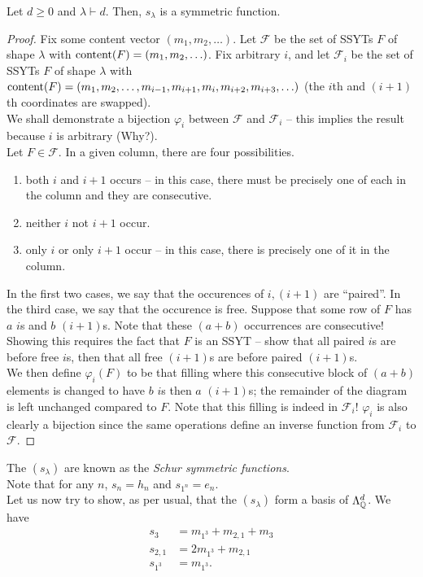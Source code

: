 	\begin{ftheo}
		Let $d \ge 0$ and $\lambda \vdash d$. Then, $s_\lambda$ is a symmetric function.
	\end{ftheo}
	\begin{proof}
		Fix some content vector $(m_1,m_2,\ldots)$. Let $\mathcal{F}$ be the set of SSYTs $F$ of shape $\lambda$ with $\operatorname{content}(F) = (m_1,m_2,\ldots)$. Fix arbitrary $i$, and let $\mathcal{F}_i$ be the set of SSYTs $F$ of shape $\lambda$ with $\operatorname{content}(F) = (m_1,m_2,\ldots,m_{i-1},m_{i+1},m_i,m_{i+2},m_{i+3},\ldots)$ (the $i$th and $(i+1)$th coordinates are swapped).\\
		We shall demonstrate a bijection $\varphi_i$ between $\mathcal{F}$ and $\mathcal{F}_i$ -- this implies the result because $i$ is arbitrary (Why?).\\
		Let $F \in \mathcal{F}$. In a given column, there are four possibilities.
		\begin{enumerate}
			\item both $i$ and $i+1$ occurs -- in this case, there must be precisely one of each in the column and they are consecutive.
			\item neither $i$ not $i+1$ occur.
			\item only $i$ or only $i+1$ occur -- in this case, there is precisely one of it in the column.
		\end{enumerate}
		In the first two cases, we say that the occurences of $i,(i+1)$ are ``paired''. In the third case, we say that the occurence is free. Suppose that some row of $F$ has $a$ $i$s and $b$ $(i+1)$s. Note that these $(a+b)$ occurrences are consecutive! Showing this requires the fact that $F$ is an SSYT -- show that all paired $i$s are before free $i$s, then that all free $(i+1)$s are before paired $(i+1)$s.\\
		We then define $\varphi_i(F)$ to be that filling where this consecutive block of $(a+b)$ elements is changed to have $b$ $i$s then $a$ $(i+1)$s; the remainder of the diagram is left unchanged compared to $F$. Note that this filling is indeed in $\mathcal{F}_i$! $\varphi_i$ is also clearly a bijection since the same operations define an inverse function from $\mathcal{F}_i$ to $\mathcal{F}$.
	\end{proof}

	The $(s_\lambda)$ are known as the \emph{Schur symmetric functions}.\\
	Note that for any $n$, $s_n = h_n$ and $s_{1^n} = e_n$.\\
	Let us now try to show, as per usual, that the $(s_\lambda)$ form a basis of $\Lambda_{\mathbb{Q}}^d$. We have
	\begin{align*}
		s_3 &= m_{1^3} + m_{2,1} + m_3 \\
		s_{2,1} &= 2m_{1^3} + m_{2,1} \\
		s_{1^3} &= m_{1^3}.
	\end{align*}

